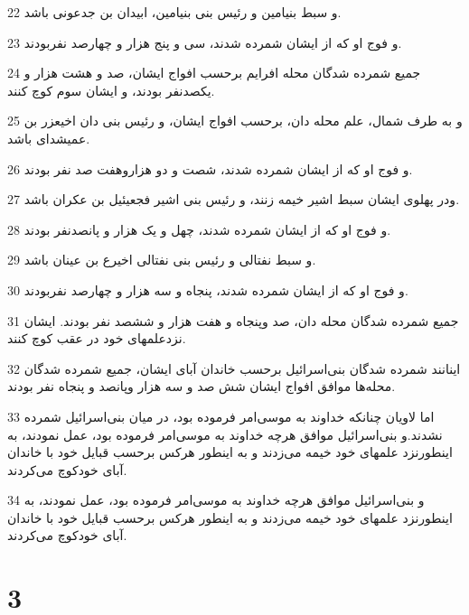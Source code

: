 \par 22 و سبط بنیامین و رئیس بنی بنیامین، ابیدان بن جدعونی باشد.
\par 23 و فوج او که از ایشان شمرده شدند، سی و پنج هزار و چهارصد نفربودند.
\par 24 جمیع شمرده شدگان محله افرایم برحسب افواج ایشان، صد و هشت هزار و یکصدنفر بودند، و ایشان سوم کوچ کنند.
\par 25 و به طرف شمال، علم محله دان، برحسب افواج ایشان، و رئیس بنی دان اخیعزر بن عمیشدای باشد.
\par 26 و فوج او که از ایشان شمرده شدند، شصت و دو هزاروهفت صد نفر بودند.
\par 27 ودر پهلوی ایشان سبط اشیر خیمه زنند، و رئیس بنی اشیر فجعیئیل بن عکران باشد.
\par 28 و فوج او که از ایشان شمرده شدند، چهل و یک هزار و پانصدنفر بودند.
\par 29 و سبط نفتالی و رئیس بنی نفتالی اخیرع بن عینان باشد.
\par 30 و فوج او که از ایشان شمرده شدند، پنجاه و سه هزار و چهارصد نفربودند.
\par 31 جمیع شمرده شدگان محله دان، صد وپنجاه و هفت هزار و ششصد نفر بودند. ایشان نزدعلمهای خود در عقب کوچ کنند.
\par 32 اینانند شمرده شدگان بنی‌اسرائیل برحسب خاندان آبای ایشان، جمیع شمرده شدگان محله‌ها موافق افواج ایشان شش صد و سه هزار وپانصد و پنجاه نفر بودند.
\par 33 اما لاویان چنانکه خداوند به موسی‌امر فرموده بود، در میان بنی‌اسرائیل شمرده نشدند.و بنی‌اسرائیل موافق هرچه خداوند به موسی‌امر فرموده بود، عمل نمودند، به اینطورنزد علمهای خود خیمه می‌زدند و به اینطور هرکس برحسب قبایل خود با خاندان آبای خودکوچ می‌کردند.
\par 34 و بنی‌اسرائیل موافق هرچه خداوند به موسی‌امر فرموده بود، عمل نمودند، به اینطورنزد علمهای خود خیمه می‌زدند و به اینطور هرکس برحسب قبایل خود با خاندان آبای خودکوچ می‌کردند.
 
\chapter{3}

